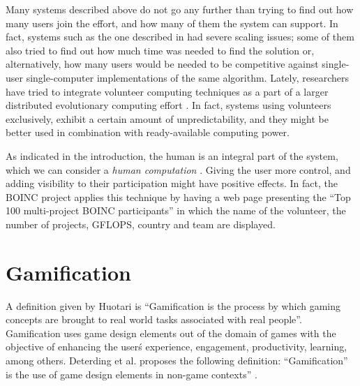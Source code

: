 \documentclass{llncs}
\begin{document}

Many systems described above do not go any further than trying to find out how many users join the effort, and how many of them the system can support. In fact, systems such as the one described in
\cite{gecco07:workshop:dcor} had severe scaling issues; some of them
also tried to find out how much time was needed to find the solution
or, alternatively, how many users would be needed to be competitive
against single-user single-computer implementations of the same
algorithm. Lately, researchers have tried to integrate volunteer
computing techniques as a part of a larger distributed evolutionary computing 
effort \cite{leclerc2016seamless}.  In fact, systems using volunteers
exclusively, exhibit a certain amount of unpredictability, and they
might be better used in combination with ready-available computing
power. 

As indicated in the introduction, the human is an integral part of the system, which we can consider a {\em human computation} \cite{quinn2011human}. Giving the user more control, and adding visibility to their participation might have positive effects. In fact, the BOINC project applies this technique by having a web page presenting the ``Top 100 multi-project BOINC participants'' in which the name of the volunteer, the number of projects, GFLOPS, country and team are displayed.

\section{Gamification}
\label{sec:gamification}
A definition given by Huotari  \cite{huotari2012defining} is ``Gamification is
the process by which gaming concepts are brought to real world tasks associated with
real people''. Gamification uses game design elements out of the domain of games
with the objective of enhancing the user\'s experience, engagement, productivity,
learning, among others. Deterding et al. proposes the following definition:
 ``Gamification” is the use of game design elements in non-game contexts''
 \cite{deterding2011gamification}.
\end{document}
